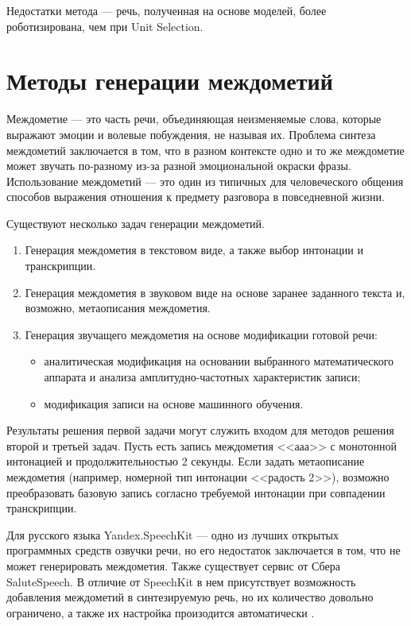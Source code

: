 Недостатки метода --- речь, полученная на основе моделей, более роботизирована, чем при Unit Selection.

\section{Методы генерации междометий}

Междометие --- это часть речи, объединяющая неизменяемые слова, которые выражают эмоции и волевые побуждения, не назы­вая их. 
Проблема синтеза междометий заключается в том, что в разном контексте одно и то же междометие может звучать по-разному из-за разной эмоциональной окраски фразы.
Использование междометий — это один из типичных для человеческого общения способов выражения отношения к предмету разговора в повседневной жизни.

Существуют несколько задач генерации междометий.
\begin{enumerate}
	\item Генерация междометия в текстовом виде, а также выбор интонации и транскрипции.
	\item Генерация междометия в звуковом виде на основе заранее заданного текста и, возможно, метаописания междометия.  
	\item Генерация звучащего междометия на основе модификации готовой речи:
	\begin{itemize}[label=---]
		\item аналитическая модификация на основании выбранного математического аппарата и анализа амплитудно-частотных характеристик записи;  
		\item модификация записи на основе машинного обучения.
		\end{itemize}
\end{enumerate}

Результаты решения первой задачи могут служить входом для методов решения второй и третьей задач. Пусть есть запись междометия <<ааа>> с монотонной интонацией и продолжительностью 2 секунды. Если задать метаописание междометия (например, номерной тип интонации <<радость 2>>), возможно преобразовать базовую запись согласно требуемой интонации при совпадении транскрипции.

Для русского языка Yandex.SpeechKit --- одно из лучших открытых программных средств озвучки речи, но его недостаток заключается в том, что не может генерировать междометия. Также существует сервис от Сбера SaluteSpeech. В отличие от SpeechKit в нем присутствует возможность добавления междометий в синтезируемую речь, но их количество довольно ограничено, а также их настройка произодится автоматически \cite{sber}.

